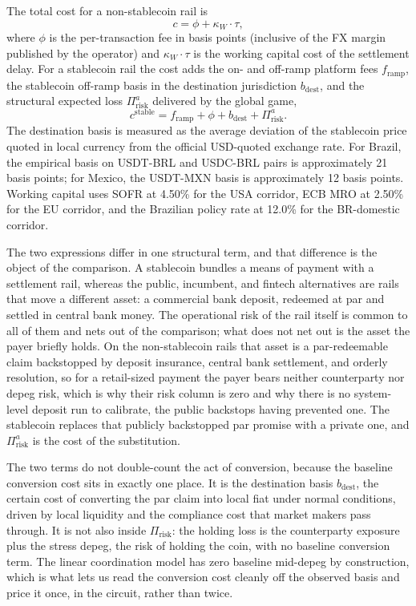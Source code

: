 The total cost for a non-stablecoin rail is
\begin{equation}\label{eq:total_cost_nonstable}
c = \phi + \kappa_W \cdot \tau,
\end{equation}
where $\phi$ is the per-transaction fee in basis points (inclusive of the FX margin published by the operator) and $\kappa_W \cdot \tau$ is the working capital cost of the settlement delay. For a stablecoin rail the cost adds the on- and off-ramp platform fees $f_{\text{ramp}}$, the stablecoin off-ramp basis in the destination jurisdiction $b_{\text{dest}}$, and the structural expected loss $\Pi_{\text{risk}}^{a}$ delivered by the global game,
\begin{equation}\label{eq:total_cost_stable}
c^{\text{stable}} = f_{\text{ramp}} + \phi + b_{\text{dest}} + \Pi_{\text{risk}}^{a}.
\end{equation}
The destination basis is measured as the average deviation of the stablecoin price quoted in local currency from the official USD-quoted exchange rate. For Brazil, the empirical basis on USDT-BRL and USDC-BRL pairs is approximately 21 basis points; for Mexico, the USDT-MXN basis is approximately 12 basis points. Working capital uses SOFR at 4.50\% for the USA corridor, ECB MRO at 2.50\% for the EU corridor, and the Brazilian policy rate at 12.0\% for the BR-domestic corridor.

The two expressions differ in one structural term, and that difference is the object of the comparison. A stablecoin bundles a means of payment with a settlement rail, whereas the public, incumbent, and fintech alternatives are rails that move a different asset: a commercial bank deposit, redeemed at par and settled in central bank money. The operational risk of the rail itself is common to all of them and nets out of the comparison; what does not net out is the asset the payer briefly holds. On the non-stablecoin rails that asset is a par-redeemable claim backstopped by deposit insurance, central bank settlement, and orderly resolution, so for a retail-sized payment the payer bears neither counterparty nor depeg risk, which is why their risk column is zero and why there is no system-level deposit run to calibrate, the public backstops having prevented one. The stablecoin replaces that publicly backstopped par promise with a private one, and $\Pi_{\text{risk}}^{a}$ is the cost of the substitution.

The two terms do not double-count the act of conversion, because the baseline conversion cost sits in exactly one place. It is the destination basis $b_{\text{dest}}$, the certain cost of converting the par claim into local fiat under normal conditions, driven by local liquidity and the compliance cost that market makers pass through. It is not also inside $\Pi_{\text{risk}}$: the holding loss is the counterparty exposure plus the stress depeg, the risk of holding the coin, with no baseline conversion term. The linear coordination model has zero baseline mid-depeg by construction, which is what lets us read the conversion cost cleanly off the observed basis and price it once, in the circuit, rather than twice.

